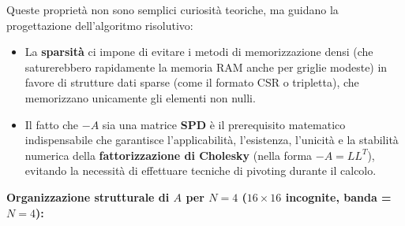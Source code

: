 \documentclass[a4paper,11pt]{article}
\theoremstyle{definition}
\begin{document}
\medskip
Queste proprietà non sono semplici curiosità teoriche, ma guidano la progettazione dell'algoritmo risolutivo:
\begin{itemize}
  \item La \textbf{sparsità} ci impone di evitare i metodi di memorizzazione densi (che saturerebbero rapidamente la memoria RAM anche per griglie modeste) in favore di strutture dati sparse (come il formato CSR o tripletta), che memorizzano unicamente gli elementi non nulli.
  \item Il fatto che $-A$ sia una matrice \textbf{SPD} è il prerequisito matematico indispensabile che garantisce l'applicabilità, l'esistenza, l'unicità e la stabilità numerica della \textbf{fattorizzazione di Cholesky} (nella forma $-A = L L^T$), evitando la necessità di effettuare tecniche di pivoting durante il calcolo.
\end{itemize}

\bigskip
\noindent\textbf{Organizzazione strutturale di $A$ per $N=4$ ($16 \times 16$ incognite, banda = $N = 4$):}
\end{document}
